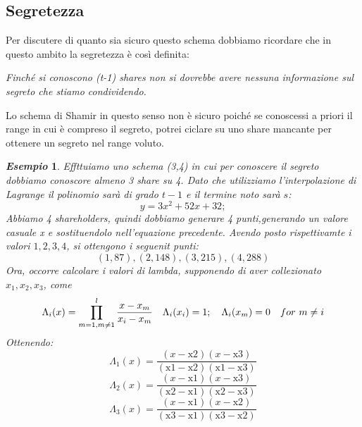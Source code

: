 \documentclass{book}
\newtheorem{esempio}{\emph{Esempio}}
\begin{document}
\subsection{Segretezza}
Per discutere di quanto sia sicuro questo schema dobbiamo ricordare che in questo ambito la segretezza è così definita:
\begin{center}
    \emph{Finché si conoscono (t-1) shares non si dovrebbe avere nessuna informazione sul segreto che stiamo condividendo.}
\end{center}
Lo schema di Shamir in questo senso non è sicuro poiché se conoscessi a priori il range in cui è compreso il segreto, potrei ciclare su uno share mancante per ottenere un segreto nel range voluto\@.
\begin{esempio}
    Effttuiamo uno schema (3,4) in cui per conoscere il segreto dobbiamo conoscore almeno 3 share su 4\@. Dato che utilizziamo l'interpolazione di Lagrange il polinomio sarà di grado \(t-1\) e il termine noto sarà \(s\):
    \begin{equation*}
        y=3 x^2+52 x+32;
    \end{equation*}
    Abbiamo 4 shareholders, quindi dobbiamo generare 4 punti,generando un valore casuale x e sostituendolo nell'equazione precedente. Avendo posto rispettivamte i valori \(1,2,3,4\), si ottengono i seguenit punti:
    \begin{equation*}
        (1,87),(2,148),(3,215),(4,288)
    \end{equation*}
    Ora, occorre calcolare i valori di lambda, supponendo di aver collezionato \(x_{1},x_{2},x_{3}\), come
    \begin{equation*}
        \centering
        \Lambda_{i}(x)=\prod_{m=1,m\neq1}^{l}{\frac{x-x_{m}}{x_{i}-x_{m}}}\quad \Lambda_{i}(x_{i})=1;\quad \Lambda_{i}(x_{m})=0\quad for\ m\neq i
    \end{equation*}
    Ottenendo:
    \begin{equation*}
        \Lambda_{1}(x)=\frac{(x-\text{x2}) (x-\text{x3}) }{(\text{x1}-\text{x2}) (\text{x1}-\text{x3}) }
    \end{equation*}
    \begin{equation*}
        \Lambda_{2}(x)=\frac{(x-\text{x1}) (x-\text{x3}) }{(\text{x2}-\text{x1}) (\text{x2}-\text{x3}) }
    \end{equation*}
    \begin{equation*}
        \Lambda_{3}(x)= \frac{(x-\text{x1}) (x-\text{x2}) }{(\text{x3}-\text{x1}) (\text{x3}-\text{x2}) }
    \end{equation*}

\end{esempio}
\end{document}
